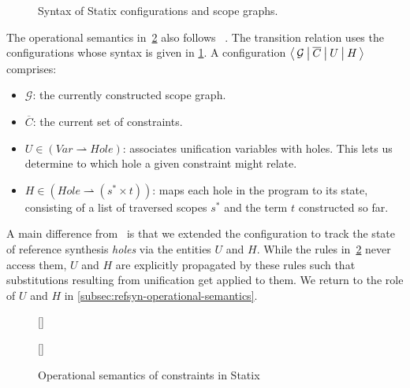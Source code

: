 \begin{figure}[t]
  
  \caption{
    Syntax of Statix configurations and scope graphs.
  }%
  \label{fig:statix-config-syntax}
\end{figure}

The operational semantics in~\cref{fig:statix-operational-semantics} also follows~ \citet{RouvoetAPKV20}.
The transition relation uses the configurations whose syntax is given in \cref{fig:statix-config-syntax}.
A configuration $\big\langle\, \mathcal{G}\: \big|\: \overline{C}\: \big|\: U\: \big|\: H\, \big\rangle$ comprises:

\begin{itemize} 
  \item $\mathcal{G}$: the currently constructed scope graph.
  \item $\overline{C}$: the current set of constraints.
  \item $U \in (\mathit{Var} \rightharpoonup \mathit{Hole})$: associates unification variables with holes.
  This lets us determine to which hole a given constraint might relate.
  \item $H \in (\mathit{Hole} \rightharpoonup (s^* \times t))$: maps each hole in the program to its state, consisting of a list of traversed scopes $s^*$ and the term $t$ constructed so far.
\end{itemize}

\noindent
A main difference from~\citeauthor{RouvoetAPKV20} is that we extended the configuration to track the state of reference synthesis \emph{holes} via the entities $U$ and $H$.
While the rules in~\cref{fig:statix-operational-semantics} never access them, $U$ and $H$ are explicitly propagated by these rules such that substitutions resulting from unification get applied to them.
We return to the role of $U$ and $H$ in \cref{subsec:refsyn-operational-semantics}.

\begin{figure}[p]
  \centering
  \subcaptionbox*{
  }[\textwidth]{
    
  }
  \subcaptionbox*{
  }[\textwidth]{
    
  }%
  \vspace{-1.5\baselineskip}
  \caption{Operational semantics of constraints in Statix}%
  \label{fig:statix-operational-semantics}
\end{figure}


